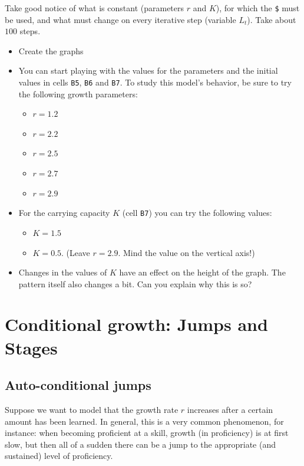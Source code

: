 \documentclass[]{book}
\providecommand{\tightlist}{%
  \setlength{\itemsep}{0pt}\setlength{\parskip}{0pt}}
\let\stdsection\section
\renewcommand\section{\newpage\stdsection}
\begin{document}
Take good notice of what is constant (parameters \(r\) and \(K\)), for
which the \texttt{\$} must be used, and what must change on every
iterative step (variable \(L_t\)). Take about \(100\) steps.

\begin{itemize}
\tightlist
\item
  Create the graphs
\item
  You can start playing with the values for the parameters and the
  initial values in cells \texttt{B5}, \texttt{B6} and \texttt{B7}. To
  study this model's behavior, be sure to try the following growth
  parameters:

  \begin{itemize}
  \tightlist
  \item
    \(r = 1.2\)
  \item
    \(r = 2.2\)
  \item
    \(r = 2.5\)
  \item
    \(r = 2.7\)
  \item
    \(r = 2.9\)
  \end{itemize}
\item
  For the carrying capacity \(K\) (cell \texttt{B7}) you can try the
  following values:

  \begin{itemize}
  \tightlist
  \item
    \(K = 1.5\)
  \item
    \(K = 0.5\). (Leave \(r = 2.9\). Mind the value on the vertical
    axis!)
  \end{itemize}
\item
  Changes in the values of \(K\) have an effect on the height of the
  graph. The pattern itself also changes a bit. Can you explain why this
  is so?
\end{itemize}

\section{Conditional growth: Jumps and
Stages}\label{conditional-growth-jumps-and-stages}

\subsection*{Auto-conditional jumps}\label{auto-conditional-jumps}

Suppose we want to model that the growth rate \(r\) increases after a
certain amount has been learned. In general, this is a very common
phenomenon, for instance: when becoming proficient at a skill, growth
(in proficiency) is at first slow, but then all of a sudden there can be
a jump to the appropriate (and sustained) level of proficiency.
\end{document}

